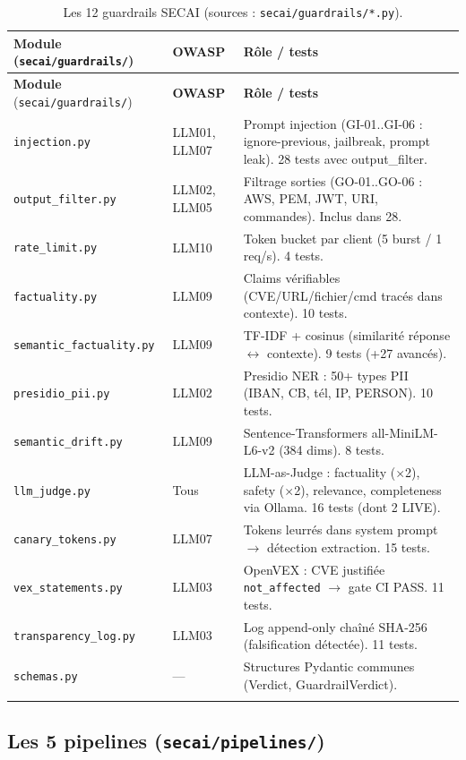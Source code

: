\documentclass[12pt,a4paper,openany]{report}
\begin{document}
\begin{longtable}{@{}lp{3cm}p{6.5cm}@{}}
\toprule
\textbf{Module} (\texttt{secai/guardrails/}) & \textbf{OWASP} & \textbf{Rôle / tests} \\
\midrule
\endfirsthead
\toprule
\textbf{Module} (\texttt{secai/guardrails/}) & \textbf{OWASP} & \textbf{Rôle / tests} \\
\midrule
\endhead
\texttt{injection.py} & LLM01, LLM07 & Prompt injection (GI-01..GI-06 : ignore-previous, jailbreak, prompt leak). 28 tests avec output\_filter. \\
\texttt{output\_filter.py} & LLM02, LLM05 & Filtrage sorties (GO-01..GO-06 : AWS, PEM, JWT, URI, commandes). Inclus dans 28. \\
\texttt{rate\_limit.py} & LLM10 & Token bucket par client (5 burst / 1 req/s). 4 tests. \\
\texttt{factuality.py} & LLM09 & Claims vérifiables (CVE/URL/fichier/cmd tracés dans contexte). 10 tests. \\
\texttt{semantic\_factuality.py} & LLM09 & TF-IDF + cosinus (similarité réponse $\leftrightarrow$ contexte). 9 tests (+27 avancés). \\
\texttt{presidio\_pii.py} & LLM02 & Presidio NER : 50+ types PII (IBAN, CB, tél, IP, PERSON). 10 tests. \\
\texttt{semantic\_drift.py} & LLM09 & Sentence-Transformers all-MiniLM-L6-v2 (384 dims). 8 tests. \\
\texttt{llm\_judge.py} & Tous & LLM-as-Judge : factuality ($\times$2), safety ($\times$2), relevance, completeness via Ollama. 16 tests (dont 2 LIVE). \\
\texttt{canary\_tokens.py} & LLM07 & Tokens leurrés dans system prompt $\rightarrow$ détection extraction. 15 tests. \\
\texttt{vex\_statements.py} & LLM03 & OpenVEX : CVE justifiée \texttt{not\_affected} $\rightarrow$ gate CI PASS. 11 tests. \\
\texttt{transparency\_log.py} & LLM03 & Log append-only chaîné SHA-256 (falsification détectée). 11 tests. \\
\texttt{schemas.py} & --- & Structures Pydantic communes (Verdict, GuardrailVerdict). \\
\bottomrule
\caption{Les 12 guardrails SECAI (sources : \texttt{secai/guardrails/*.py}).}
\label{tab:guardrails}
\end{longtable}

\subsection{Les 5 pipelines (\texttt{secai/pipelines/})}
\end{document}

